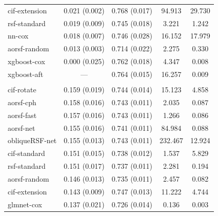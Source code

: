 \documentclass{article}\usepackage[]{graphicx}\usepackage[]{xcolor}
\newenvironment{knitrout}{}{} %
\begin{document}
\begin{knitrout}
\begin{longtable}[t]{lcccc}
\hspace{1em}cif-extension & 0.021 (0.002) & 0.768 (0.017) & 94.913 & 29.730\\
\hspace{1em}rsf-standard & 0.019 (0.009) & 0.745 (0.018) & 3.221 & 1.242\\
\hspace{1em}nn-cox & 0.018 (0.007) & 0.746 (0.028) & 16.152 & 17.979\\
\hspace{1em}aorsf-random & 0.013 (0.003) & 0.714 (0.022) & 2.275 & 0.330\\
\hspace{1em}xgboost-cox & 0.000 (0.025) & 0.762 (0.018) & 4.347 & 0.008\\
\hspace{1em}xgboost-aft & --- & 0.764 (0.015) & 16.257 & 0.009\\
\addlinespace[0.3em]
\multicolumn{5}{l}{\textit{\textbf{Monoclonal gammopathy; death, n = 1384, p = 8}}}\\
\hline
\hspace{1em}cif-rotate & 0.159 (0.019) & 0.744 (0.014) & 15.123 & 4.858\\
\hspace{1em}aorsf-cph & 0.158 (0.016) & 0.743 (0.011) & 2.035 & 0.087\\
\hspace{1em}aorsf-fast & 0.157 (0.016) & 0.743 (0.011) & 1.266 & 0.086\\
\hspace{1em}aorsf-net & 0.155 (0.016) & 0.741 (0.011) & 84.984 & 0.088\\
\hspace{1em}obliqueRSF-net & 0.155 (0.013) & 0.743 (0.011) & 232.467 & 12.924\\
\hspace{1em}cif-standard & 0.151 (0.015) & 0.738 (0.012) & 1.537 & 5.829\\
\hspace{1em}rsf-standard & 0.151 (0.017) & 0.737 (0.011) & 2.281 & 0.194\\
\hspace{1em}aorsf-random & 0.146 (0.013) & 0.735 (0.011) & 2.457 & 0.082\\
\hspace{1em}cif-extension & 0.143 (0.009) & 0.747 (0.013) & 11.222 & 4.744\\
\hspace{1em}glmnet-cox & 0.137 (0.021) & 0.726 (0.014) & 0.136 & 0.003\\

\end{longtable}
\end{knitrout}
\end{document}
